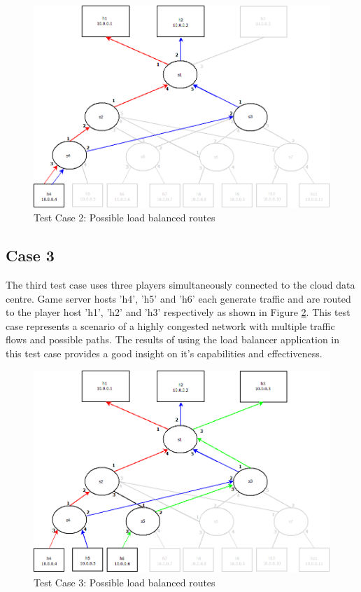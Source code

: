 \clearpage
\begin{figure}[h!]
 \includegraphics[width=\linewidth]{images/test2.png}
 \caption{Test Case 2: Possible load balanced routes}
 \label{fig:test2}
\end{figure}

\subsection{Case 3}
The third test case uses three players simultaneously connected to the cloud data centre. Game server hosts 'h4', 'h5' and 'h6' each generate traffic and are routed to the player host 'h1', 'h2' and 'h3' respectively as shown in Figure \ref{fig:test3}. This test case represents a scenario of a highly congested network with multiple traffic flows and possible paths. The results of using the load balancer application in this test case provides a good insight on it's capabilities and effectiveness.

\clearpage
\begin{figure}[h!]
 \includegraphics[width=\linewidth]{images/test3.png}
 \caption{Test Case 3: Possible load balanced routes}
 \label{fig:test3}
\end{figure}

